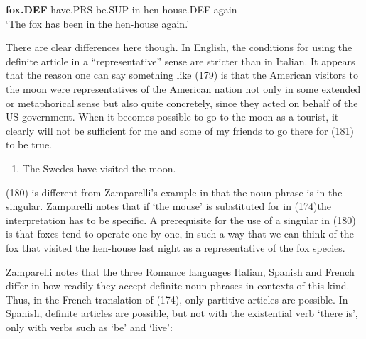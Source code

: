 \textbf{fox.DEF} have.PRS  be.SUP  in  hen-house.DEF  again\\ %


‘The fox has been in the hen-house again.’
\z


There are clear differences here though. In English, the conditions for using the definite article in a “representative” sense are stricter than in Italian. It appears that the reason one can say something like (179) is that the American visitors to the moon were representatives of the American nation not only in some extended or metaphorical sense but also quite concretely, since they acted on behalf of the US government. When it becomes possible to go to the moon as a tourist, it clearly will not be sufficient for me and some of my friends to go there for (181) to be true.

\begin{enumerate} %
\item 
\label{bkm:Ref94431191}The Swedes have visited the moon.

\end{enumerate} %
(180) is different from Zamparelli’s example in that the noun phrase is in the singular. Zamparelli notes that if  ‘the mouse’ is substituted for in (174)\textstyleLinguisticExample{, }the interpretation has to be specific. A prerequisite for the use of a singular in (180) is that foxes tend to operate one by one, in such a way that we can think of the fox that visited the hen-house last night as a representative of the fox species. 

Zamparelli notes that the three Romance languages Italian, Spanish and French differ in how readily they accept definite noun phrases in contexts of this kind. Thus, in the French translation of (174), only partitive articles are possible. In Spanish, definite articles are possible, but not with the existential verb  ‘there is’, only with verbs such as  ‘be’ and  ‘live’:


